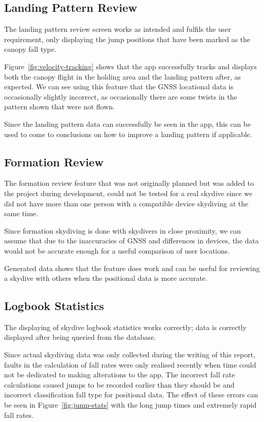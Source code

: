 \subsection{Landing Pattern Review}
The landing pattern review screen works as intended and fulfils the user requirement, only displaying the jump positions that have been marked as the canopy fall type.

Figure~\vref{fig:velocity-tracking} shows that the app successfully tracks and displays both the canopy flight in the holding area and the landing pattern after, as expected. We can see using this feature that the GNSS locational data is occasionally slightly incorrect, as occasionally there are some twists in the pattern shown that were not flown.

Since the landing pattern data can successfully be seen in the app, this can be used to come to conclusions on how to improve a landing pattern if applicable.

\subsection{Formation Review}
The formation review feature that was not originally planned but was added to the project during development, could not be tested for a real skydive since we did not have more than one person with a compatible device skydiving at the same time.

Since formation skydiving is done with skydivers in close proximity, we can assume that due to the inaccuracies of GNSS and differences in devices, the data would not be accurate enough for a useful comparison of user locations.

Generated data shows that the feature does work and can be useful for reviewing a skydive with others when the positional data is more accurate.

\subsection{Logbook Statistics}
The displaying of skydive logbook statistics works correctly; data is correctly displayed after being queried from the database.

Since actual skydiving data was only collected during the writing of this report, faults in the calculation of fall rates were only realised recently when time could not be dedicated to making alterations to the app. The incorrect fall rate calculations caused jumps to be recorded earlier than they should be and incorrect classification fall type for positional data. The effect of these errors can be seen in Figure~\vref{fig:jump-stats} with the long jump times and extremely rapid fall rates.

